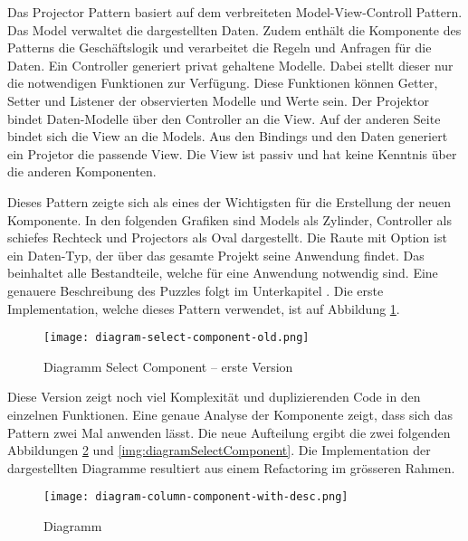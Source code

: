 Das Projector Pattern basiert auf dem verbreiteten Model-View-Controll Pattern.
Das Model verwaltet die dargestellten Daten.
Zudem enthält die Komponente des Patterns die Geschäftslogik und verarbeitet die Regeln und Anfragen für die Daten.
Ein Controller generiert privat gehaltene Modelle.
Dabei stellt dieser nur die notwendigen Funktionen zur Verfügung.
Diese Funktionen können Getter, Setter und Listener der observierten Modelle und Werte sein.
Der Projektor bindet Daten-Modelle über den Controller an die View.
Auf der anderen Seite bindet sich die View an die Models.
Aus den Bindings und den Daten generiert ein Projetor die passende View.
Die View ist passiv und hat keine Kenntnis über die anderen Komponenten.

Dieses Pattern zeigte sich als eines der Wichtigsten für die Erstellung der neuen Komponente.
In den folgenden Grafiken sind Models als Zylinder, Controller als schiefes Rechteck und Projectors als Oval dargestellt.
Die Raute mit Option ist ein Daten-Typ, der über das gesamte Projekt seine Anwendung findet.
Das  beinhaltet alle Bestandteile, welche für eine Anwendung notwendig sind.
Eine genauere Beschreibung des Puzzles folgt im Unterkapitel \textbf{}.
Die erste Implementation, welche dieses Pattern verwendet, ist auf Abbildung \ref{img:diagramSelectComponentOld}.

\begin{figure}[!htb]
    \centering
    \texttt{[image: diagram-select-component-old.png]}
    \caption{Diagramm Select Component – erste Version}
    \label{img:diagramSelectComponentOld}
\end{figure}

Diese Version zeigt noch viel Komplexität und duplizierenden Code in den einzelnen Funktionen.
Eine genaue Analyse der Komponente zeigt, dass sich das Pattern zwei Mal anwenden lässt.
Die neue Aufteilung ergibt die zwei folgenden Abbildungen \ref{img:diagramColumnComponent} und \ref{img:diagramSelectComponent}.
Die Implementation der dargestellten Diagramme resultiert aus einem Refactoring im grösseren Rahmen.

\begin{figure}[!htb]
    \centering
    \texttt{[image: diagram-column-component-with-desc.png]}
    \caption{Diagramm }
    \label{img:diagramColumnComponent}
\end{figure}

